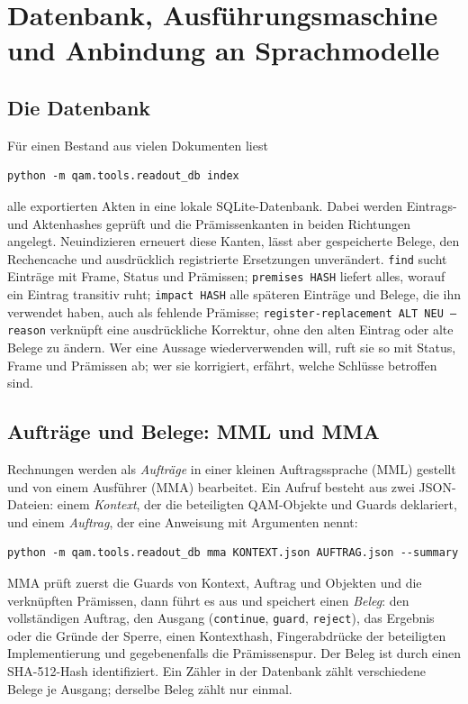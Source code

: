 \section{Datenbank, Ausführungsmaschine und Anbindung an Sprachmodelle}\label{sec:maschine}

\subsection{Die Datenbank}\label{sec:datenbank}

Für einen Bestand aus vielen Dokumenten liest
\begin{lstlisting}
python -m qam.tools.readout_db index
\end{lstlisting}
alle exportierten Akten in eine lokale SQLite-Datenbank. Dabei werden Eintrags- und Aktenhashes geprüft und die Prämissenkanten in beiden
Richtungen angelegt. Neuindizieren erneuert diese Kanten, lässt aber gespeicherte Belege, den Rechencache und ausdrücklich registrierte
Ersetzungen unverändert. \texttt{find} sucht Einträge mit Frame, Status und Prämissen; \texttt{premises HASH} liefert alles, worauf
ein Eintrag transitiv ruht; \texttt{impact HASH} alle späteren Einträge und Belege, die ihn verwendet haben, auch als fehlende Prämisse;
\texttt{register-replacement ALT NEU --reason} verknüpft eine ausdrückliche Korrektur, ohne den alten Eintrag oder alte Belege zu ändern.
Wer eine Aussage wiederverwenden will, ruft sie so mit Status, Frame und Prämissen ab; wer sie korrigiert, erfährt, welche Schlüsse
betroffen sind.

\subsection{Aufträge und Belege: MML und MMA}

Rechnungen werden als \emph{Aufträge} in einer kleinen Auftragssprache (MML) gestellt und von einem Ausführer (MMA) bearbeitet. Ein Aufruf
besteht aus zwei JSON-Dateien: einem \emph{Kontext}, der die beteiligten QAM-Objekte und Guards deklariert, und einem \emph{Auftrag}, der eine
Anweisung mit Argumenten nennt:
\begin{lstlisting}
python -m qam.tools.readout_db mma KONTEXT.json AUFTRAG.json --summary
\end{lstlisting}
MMA prüft zuerst die Guards von Kontext, Auftrag und Objekten und die verknüpften Prämissen, dann führt es aus und speichert einen
\emph{Beleg}: den vollständigen Auftrag, den Ausgang (\texttt{continue}, \texttt{guard}, \texttt{reject}), das Ergebnis oder die Gründe der
Sperre, einen Kontexthash, Fingerabdrücke der beteiligten Implementierung und gegebenenfalls die Prämissenspur. Der Beleg ist durch einen
SHA-512-Hash identifiziert. Ein Zähler in der Datenbank zählt verschiedene Belege je Ausgang; derselbe Beleg zählt nur einmal.

